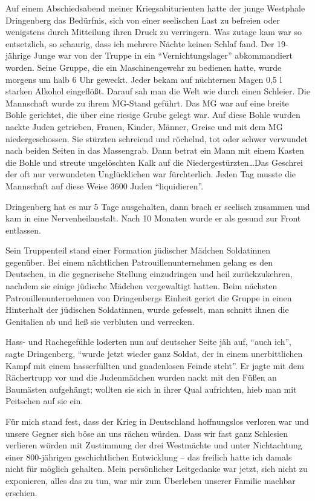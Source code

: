 \documentclass[a5paper,pagesize,10pt,twoside=true]{scrbook}
\renewcommand{\marginpar}[2][]{}
\begin{document}
Auf einem Abschiedsabend meiner Kriegsabiturienten hatte der junge Westphale Dringenberg das Bedürfnis, sich von einer seelischen Last zu befreien oder wenigstens durch Mitteilung ihren Druck zu verringern. Was zutage kam war so entsetzlich, so schaurig, dass ich mehrere Nächte keinen Schlaf fand. Der 19-jährige Junge war von der Truppe in ein \enquote{Vernichtungslager} abkommandiert worden. Seine Gruppe, die ein Maschinengewehr zu bedienen hatte, wurde morgens um halb 6 Uhr geweckt. Jeder bekam auf nüchternen Magen 0,5 l starken Alkohol eingeflößt. Darauf sah man die Welt wie durch einen Schleier. \marginpar{37} Die Mannschaft wurde zu ihrem MG-Stand geführt. Das MG war auf eine breite Bohle gerichtet, die über eine riesige Grube gelegt war. Auf diese Bohle wurden nackte Juden getrieben, Frauen, Kinder, Männer, Greise und mit dem MG niedergeschossen. Sie stürzten schreiend und röchelnd, tot oder schwer verwundet nach beiden Seiten in das Massengrab. Dann betrat ein Mann mit einem Kasten die Bohle und streute ungelöschten Kalk auf die Niedergestürzten\dots Das Geschrei der oft nur verwundeten Unglücklichen war fürchterlich. Jeden Tag musste die Mannschaft auf diese Weise \num{3600} Juden \enquote{liquidieren}.

Dringenberg hat es nur 5 Tage ausgehalten, dann brach er seelisch zusammen und kam in eine Nervenheilanstalt. Nach 10 Monaten wurde er als gesund zur Front entlassen.

\marginpar{38} Sein Truppenteil stand einer Formation jüdischer Mädchen Soldatinnen gegenüber. Bei einem nächtlichen Patrouillenunternehmen gelang es den Deutschen, in die gegnerische Stellung einzudringen und heil zurückzukehren, nachdem sie einige jüdische Mädchen vergewaltigt hatten. Beim nächsten Patrouillenunternehmen von Dringenbergs Einheit geriet die Gruppe in einen Hinterhalt der jüdischen Soldatinnen, wurde gefesselt, man schnitt ihnen die Genitalien ab und ließ sie verbluten und verrecken.

Hass- und Rachegefühle loderten nun auf deutscher Seite jäh auf, \enquote{auch ich}, sagte Dringenberg, \enquote{wurde jetzt wieder ganz Soldat, der in einem unerbittlichen Kampf mit einem hasserfüllten und gnadenlosen Feinde steht}. Er jagte mit dem Rächertrupp vor und die Judenmädchen wurden nackt mit den Füßen an Baumästen aufgehängt; wollten sie sich in ihrer Qual aufrichten, hieb man mit Peitschen auf sie ein.

\marginpar{39} Für mich stand fest, dass der Krieg in Deutschland hoffnungslos verloren war und unsere Gegner sich böse an uns rächen würden. Dass wir fast ganz Schlesien verlieren würden mit Zustimmung der drei Westmächte und unter Nichtachtung einer 800-jährigen geschichtlichen Entwicklung -- das freilich hatte ich damals nicht für möglich gehalten. Mein persönlicher Leitgedanke war jetzt, sich nicht zu exponieren, alles das zu tun, war mir zum Überleben unserer Familie machbar erschien.
\end{document}
